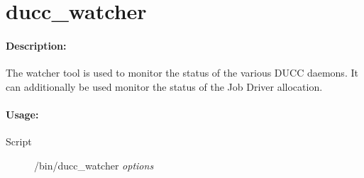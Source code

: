% 
% 
% 
% 
\ifpdf
\else
{}
\fi
    \section{ducc\_watcher}
    \label{sec:cli.tools-ducc-watcher}    

  \paragraph{Description:}
    The watcher tool is used to monitor the status of the various DUCC daemons. 
    It can additionally be used monitor the status of the Job Driver allocation.
   
  \paragraph{Usage:}
    \begin{description}
    \item[Script] \ducchome/bin/ducc\_watcher {\em options}
    \end{description}
    
